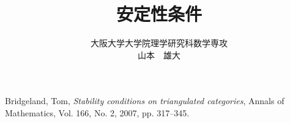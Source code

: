 \documentclass[leqno]{ltjsarticle}
\begin{document}
\title{安定性条件}
\date{}
\author{大阪大学大学院理学研究科数学専攻\\山本　雄大}
\maketitle
\tableofcontents




\begin{thebibliography}{B9}
	Bridgeland, Tom,
		\textit{Stability conditions on triangulated categories},
	Annals of Mathematics, Vol. 166, No. 2, 2007, pp. 317–345.
\end{thebibliography}
\end{document}
